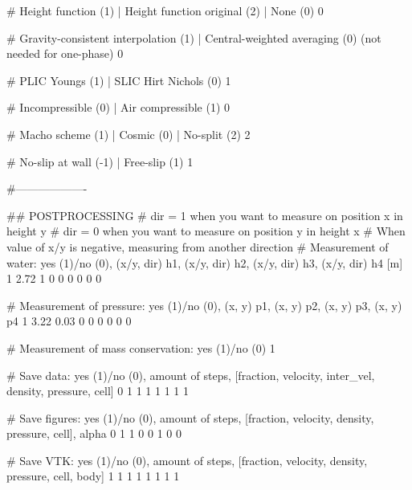 # Height function (1)	| Height function original (2) | None (0)
0

# Gravity-consistent interpolation (1)	|	Central-weighted averaging (0) (not needed for one-phase)
0

# PLIC Youngs (1)	| SLIC Hirt Nichols (0)
1

# Incompressible (0)	| Air compressible (1)
0

# Macho scheme (1)	|  Cosmic (0) | No-split (2)
2

# No-slip at wall (-1)	| Free-slip (1)
1


#-------------------

## POSTPROCESSING
# dir = 1 when you want to measure on position x in height y
# dir = 0 when you want to measure on position y in height x
# When value of x/y is negative, measuring from another direction
# Measurement of water: yes (1)/no (0), (x/y, dir) h1, (x/y, dir) h2, (x/y, dir) h3, (x/y, dir) h4 [m]
1	2.72 1		0 0 	0 0		0 0

# Measurement of pressure: yes (1)/no (0), (x, y) p1, (x, y) p2, (x, y) p3, (x, y) p4
1	3.22 0.03 		0 0  0 0		0 0

# Measurement of mass conservation: yes (1)/no (0)
1

# Save data: yes (1)/no (0), amount of steps, [fraction, velocity, inter_vel, density, pressure, cell]
0	1	1 1 1 1 1 1

# Save figures: yes (1)/no (0), amount of steps, [fraction, velocity, density, pressure, cell], alpha
0 	1	1 0 0 1 0	0

# Save VTK: yes (1)/no (0), amount of steps, [fraction, velocity, density, pressure, cell, body]
1 	1	1 1 1 1 1 1




